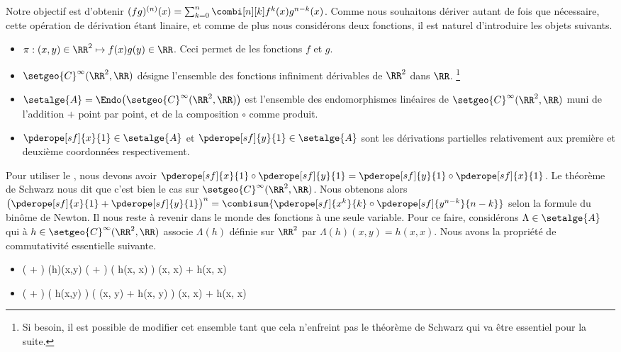 Notre objectif est d'obtenir
$(fg)^{(n)} (x) = \sum_{k=0}^n \combi[n][k] f^k(x) g^{n-k}(x)$.
%
Comme nous souhaitons dériver autant de fois que nécessaire, cette opération de dérivation étant linaire,
et
comme de plus nous considérons deux fonctions,
il est naturel d'introduire les objets suivants.
%
\begin{itemize}
	\item $\pi: (x,y) \in \RR^2 \mapsto f(x) g(y) \in \RR$. Ceci permet de  les fonctions $f$ et $g$.

	\item $\setgeo{C}^{\infty}(\RR^2 , \RR)$ désigne l'ensemble des fonctions infiniment dérivables de $\RR^2$ dans $\RR$.%
	\footnote{
		Si besoin, il est possible de modifier cet ensemble tant que cela n'enfreint pas le théorème de Schwarz qui va être essentiel pour la suite.
	}

	\item $\setalge{A} = \Endo \big( \setgeo{C}^{\infty}(\RR^2 , \RR) \big)$ est l'ensemble des endomorphismes linéaires de $\setgeo{C}^{\infty}(\RR^2 , \RR)$ muni de l'addition $+$ point par point, et de la composition $\circ$ comme produit.

	\item $\pderope[sf]{x}{1} \in \setalge{A}$ et $\pderope[sf]{y}{1} \in \setalge{A}$ sont les dérivations partielles relativement aux première et deuxième coordonnées respectivement. 
\end{itemize}


Pour utiliser le , nous devons avoir $\pderope[sf]{x}{1} \circ \pderope[sf]{y}{1} = \pderope[sf]{y}{1} \circ \pderope[sf]{x}{1}$. Le théorème de Schwarz nous dit que c'est bien le cas sur $\setgeo{C}^{\infty}(\RR^2 , \RR)$.
%
Nous obtenons alors
$\big( \pderope[sf]{x}{1} + \pderope[sf]{y}{1} \big)^n = \combisum{ \pderope[sf]{x^k}{k} \circ \pderope[sf]{y^{n-k}}{n-k}}$
selon la formule du binôme de Newton.
%
Il nous reste à revenir dans le monde des fonctions à une seule variable. Pour ce faire, considérons $\Lambda \in \setalge{A}$ qui à $h \in \setgeo{C}^{\infty}(\RR^2 , \RR)$ associe $\Lambda(h)$ définie sur $\RR^2$ par $\Lambda(h)(x,y) = h(x, x)$.
%
Nous avons la propriété de commutativité essentielle suivante.
%
\begin{itemize}
	\item
	\begin{stepcalc}[style=sar]
		\big(  +  \big) \circ \Lambda(h)(x,y)
	\explnext{}
		\big(  +  \big) \big( h(x, x) \big)
	\explnext{}
		(x, x) + h(x, x)
	\end{stepcalc}


	\item
	\begin{stepcalc}[style=sar]
		\Lambda \circ \big(  +  \big) \big( h(x,y) \big)
	\explnext{}
		\Lambda \big( (x, y) + h(x, y) \big)
	\explnext{}
		(x, x) + h(x, x)
	\end{stepcalc}
\end{itemize}


